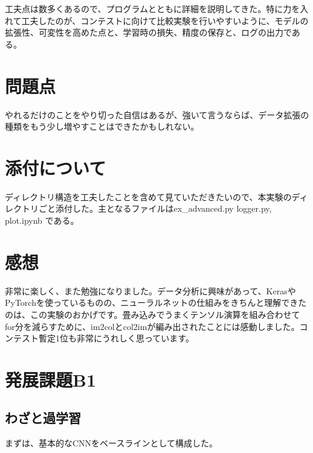 \documentclass[platex,dvipdfmx]{jsarticle}
\begin{document}
工夫点は数多くあるので、プログラムとともに詳細を説明してきた。特に力を入れて工夫したのが、コンテストに向けて比較実験を行いやすいように、モデルの拡張性、可変性を高めた点と、学習時の損失、精度の保存と、ログの出力である。

\section{問題点}

やれるだけのことをやり切った自信はあるが、強いて言うならば、データ拡張の種類をもう少し増やすことはできたかもしれない。

\section{添付について}
ディレクトリ構造を工夫したことを含めて見ていただきたいので、本実験のディレクトリごと添付した。主となるファイルはex\_advanced.py logger.py, plot.ipynb である。

\section{感想}

非常に楽しく、また勉強になりました。データ分析に興味があって、KerasやPyTorchを使っているものの、ニューラルネットの仕組みをきちんと理解できたのは、この実験のおかげです。畳み込みでうまくテンソル演算を組み合わせてfor分を減らすために、im2colとcol2imが編み出されたことには感動しました。コンテスト暫定1位も非常にうれしく思っています。

\section{発展課題B1}

\subsection{わざと過学習}

まずは、基本的なCNNをベースラインとして構成した。
\end{document}
